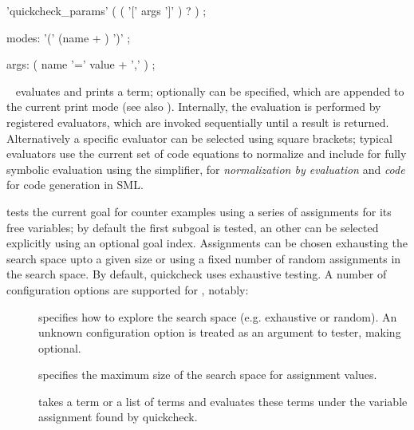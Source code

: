 \begin{isabellebody}
\begin{isamarkuptext}
\begin{rail}
    'quickcheck_params' ( ( '[' args ']' ) ? )
    ;

    modes: '(' (name + ) ')'
    ;

    args: ( name '=' value + ',' )
    ;
  \end{rail}

  \begin{description}

  \item \hyperlink{command.HOL.value}{\mbox{}}~ evaluates and prints a
    term; optionally  can be specified, which are
    appended to the current print mode (see also \cite{isabelle-ref}).
    Internally, the evaluation is performed by registered evaluators,
    which are invoked sequentially until a result is returned.
    Alternatively a specific evaluator can be selected using square
    brackets; typical evaluators use the current set of code equations
    to normalize and include  for fully symbolic evaluation
    using the simplifier,  for \emph{normalization by evaluation}
    and \emph{code} for code generation in SML.

  \item \hyperlink{command.HOL.quickcheck}{\mbox{}} tests the current goal for
    counter examples using a series of assignments for its
    free variables; by default the first subgoal is tested, an other
    can be selected explicitly using an optional goal index.
    Assignments can be chosen exhausting the search space upto a given
    size or using a fixed number of random assignments in the search space.
    By default, quickcheck uses exhaustive testing.
    A number of configuration options are supported for
    \hyperlink{command.HOL.quickcheck}{\mbox{}}, notably:

    \begin{description}

    \item[] specifies how to explore the search space
      (e.g. exhaustive or random).
      An unknown configuration option is treated as an argument to tester,
      making  optional.
    \item[] specifies the maximum size of the search space
    for assignment values.

    \item[] takes a term or a list of terms and evaluates
      these terms under the variable assignment found by quickcheck.


\end{description}
\end{description}
\end{isamarkuptext}
\end{isabellebody}
